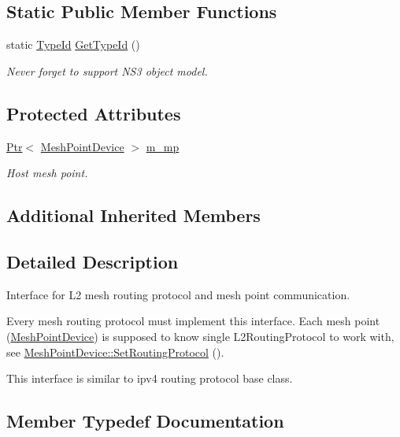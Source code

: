 \subsection*{Static Public Member Functions}
\begin{DoxyCompactItemize}
\item 
static \hyperlink{classns3_1_1TypeId}{Type\+Id} \hyperlink{classns3_1_1MeshL2RoutingProtocol_aa859288b78b73dd02758ca3fcc49187d}{Get\+Type\+Id} ()
\begin{DoxyCompactList}\small\item\em Never forget to support N\+S3 object model. \end{DoxyCompactList}\end{DoxyCompactItemize}
\subsection*{Protected Attributes}
\begin{DoxyCompactItemize}
\item 
\hyperlink{classns3_1_1Ptr}{Ptr}$<$ \hyperlink{classns3_1_1MeshPointDevice}{Mesh\+Point\+Device} $>$ \hyperlink{classns3_1_1MeshL2RoutingProtocol_af4ebb2340b72dfc607ddf3c1ae65b54a}{m\+\_\+mp}
\begin{DoxyCompactList}\small\item\em Host mesh point. \end{DoxyCompactList}\end{DoxyCompactItemize}
\subsection*{Additional Inherited Members}


\subsection{Detailed Description}
Interface for L2 mesh routing protocol and mesh point communication. 

Every mesh routing protocol must implement this interface. Each mesh point (\hyperlink{classns3_1_1MeshPointDevice}{Mesh\+Point\+Device}) is supposed to know single L2\+Routing\+Protocol to work with, see \hyperlink{classns3_1_1MeshPointDevice_a2f487dde5dd7b11b13ad8617c7172d16}{Mesh\+Point\+Device\+::\+Set\+Routing\+Protocol} ().

This interface is similar to ipv4 routing protocol base class. 

\subsection{Member Typedef Documentation}
